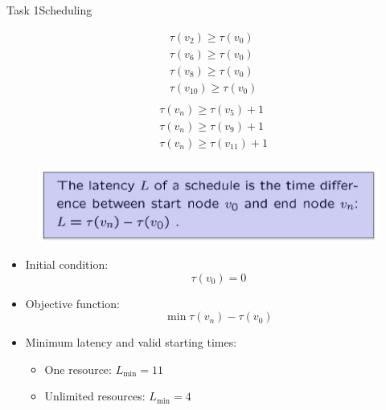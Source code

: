 \begin{frame}[allowframebreaks]{Task 1}{Scheduling}
\begin{solution}
\[\begin{aligned}
            & \tau\left(v_2\right)\ge\tau\left(v_0\right) \\
            & \tau\left(v_6\right)\ge\tau\left(v_0\right) \\
            & \tau\left(v_8\right)\ge\tau\left(v_0\right) \\
            & \tau\left(v_{10}\right)\ge\tau\left(v_0\right) \\
          \end{aligned}
        \]
        \[
          \begin{aligned}
            & \tau\left(v_n\right)\ge\tau\left(v_5\right)+1 \\
            & \tau\left(v_n\right)\ge\tau\left(v_9\right)+1 \\
            & \tau\left(v_n\right)\ge\tau\left(v_{11}\right)+1 \\
          \end{aligned}
        \]
  \end{solution}
  \begin{requirementsnoinc}
    \begin{figure}
      \centering
      \includegraphics[height=0.2\paperheight]{./figures/task1_latency.png}
    \end{figure}
  \end{requirementsnoinc}
  \begin{solution}
    \begin{itemize}
      \item Initial condition:
        \[
        \tau\left(v_0\right)=0
        \]
      \item Objective function:
        \[
        \min \tau\left(v_n\right)-\tau\left(v_0\right)
        \]
    \end{itemize}
  \end{solution}
  \framebreak
  \begin{solutionnoinc}
    \begin{itemize}
      \item Minimum latency and valid starting times:
        \begin{itemize}
          \item One resource: $L_{\min }=11$
          \item Unlimited resources: $L_{\min }=4$

\end{itemize}
\end{itemize}
\end{solutionnoinc}
\end{frame}
